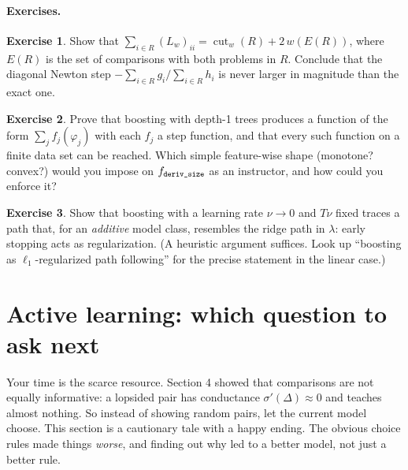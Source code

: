 \documentclass[11pt]{article}
\theoremstyle{definition}
\newtheorem{exercise}{Exercise}[section]
\theoremstyle{plain}
\theoremstyle{remark}
\newcommand{\code}[1]{\texttt{#1}}
\renewcommand{\_}{\oldunderscore\allowbreak}
\begin{document}
\paragraph{Exercises.}
\begin{exercise}\label{ex:cut}
Show that $\sum_{i\in R}(L_w)_{ii}=\operatorname{cut}_w(R)+2\,w(E(R))$, where $E(R)$ is the set of comparisons with both problems in $R$. Conclude that the
diagonal Newton step $-\sum_{i\in R}g_i/\sum_{i\in R}h_i$ is never larger in magnitude than the exact one.
\end{exercise}
\begin{exercise}
Prove that boosting with depth-1 trees produces a function of the form $\sum_jf_j(\varphi_j)$ with each $f_j$ a step function, and that every such function on a
finite data set can be reached. Which simple feature-wise shape (monotone? convex?) would you impose on $f_{\code{deriv\_size}}$ as an instructor, and how
could you enforce it?
\end{exercise}
\begin{exercise}
Show that boosting with a learning rate $\nu\to0$ and $T\nu$ fixed traces a path that, for an \emph{additive} model class, resembles the ridge path in $\lambda$:
early stopping acts as regularization. (A heuristic argument suffices. Look up ``boosting as $\ell_1$-regularized path following'' for the precise
statement in the linear case.)
\end{exercise}

\section{Active learning: which question to ask next}
\label{sec:active}

Your time is the scarce resource. Section 4 showed that comparisons are not equally informative: a lopsided pair has
conductance $\sigma'(\Delta)\approx0$ and teaches almost nothing. So instead of showing random pairs, let the current model
choose. This section is a cautionary tale with a happy ending. The obvious choice rules made things \emph{worse}, and
finding out why led to a better model, not just a better rule.
\end{document}
